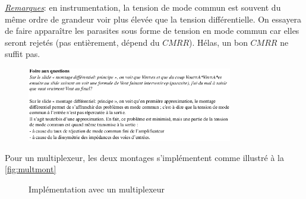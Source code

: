 \underline{\textit{Remarques}}: en instrumentation, la tension de mode commun est souvent du même ordre de grandeur  voir plus élevée que la tension différentielle. On essayera de faire apparaître les parasites sous forme de tension en mode commun car elles seront rejetés (pas entièrement, dépend du \(CMRR\)). Hélas, un bon \(CMRR\) ne suffit pas.
\begin{figure}[H] 
	\centering 
	\includegraphics[width=0.8\textwidth,height=10\baselineskip,keepaspectratio]{ch3/image14} 
\end{figure}
Pour un multiplexeur, les deux montages s'implémentent comme illustré à la \autoref{fig:multmont}
\begin{figure}[H]
	\centering
	\caption{Implémentation avec un multiplexeur}
	\label{fig:multmont}
\end{figure}

